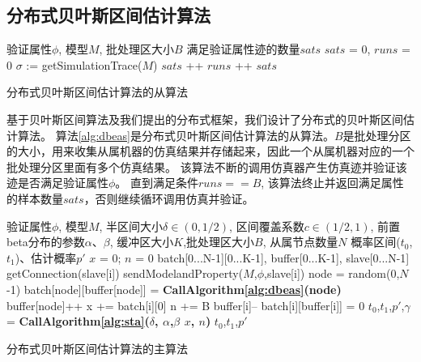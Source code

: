 \subsection{分布式贝叶斯区间估计算法}
\begin{algorithm}[t]
\begin{algorithmic}[1]
\REQUIRE 验证属性$\phi$, 模型$M$, 批处理区大小$B$
\ENSURE 满足验证属性迹的数量$sats$
\STATE $sats$ = 0, $runs$ = 0
\LOOP
        \STATE $\sigma$ := getSimulationTrace($M$)
        \IF{$\sigma \models \phi$}
        \STATE $sats$ ++
        \ENDIF
        \STATE $runs$ ++ 
        \RETURN $sats$
        \ENDIF
\ENDLOOP
\end{algorithmic}
\caption{分布式贝叶斯区间估计算法的从算法}
\label{alg:dbeas}
\end{algorithm}
基于贝叶斯区间算法及我们提出的分布式框架，我们设计了分布式的贝叶斯区间估计算法。 算法\ref{alg:dbeas}是分布式贝叶斯区间估计算法的从算法。$B$是批处理分区的大小，用来收集从属机器的仿真结果并存储起来，因此一个从属机器对应的一个批处理分区里面有多个仿真结果。 该算法不断的调用仿真器产生仿真迹并验证该迹是否满足验证属性$\phi$。 直到满足条件$runs == B$, 该算法终止并返回满足属性的样本数量$sats$，否则继续循环调用仿真并验证。
\begin{algorithm}[t]
\begin{algorithmic}[1]
\REQUIRE 验证属性$\phi$, 模型$M$, 半区间大小$\delta \in (0, 1/2)$, 区间覆盖系数$c \in (1/2, 1)$, 前置beta分布的参数$\alpha$、$\beta$, 缓冲区大小$K$,批处理区大小$B$, 从属节点数量$N$
\ENSURE 概率区间($t_0$, $t_1$)、估计概率$p'$
\STATE $x$ = 0; $n$ = 0
\STATE batch[0...N-1][0...K-1], buffer[0...K-1], slave[0...N-1]
\LOOP 
\STATE getConnection(slave[i])
\STATE sendModelandProperty($M$,$\phi$,slave[i])
\RETURN
\ENDIF
\ENDLOOP
\LOOP
        \STATE node = random(0,$N$-1)
         \STATE batch[node][buffer[node]] = \textbf{CallAlgorithm\ref{alg:dbeas}(node)}
         \STATE buffer[node]++
         \ENDIF
         \LOOP
             \STATE x += batch[i][0]
              \STATE n += B
             \STATE buffer[i]--
             \STATE batch[i][buffer[i]] = 0
         \RETURN
         \ENDIF
         \ENDLOOP
         \ENDIF
         \STATE $t_0$,$t_1$,$p'$,$\gamma$ = \textbf{CallAlgorithm\ref{alg:sta}($\delta$, $\alpha$,$\beta$ $x$, $n$)}
         \RETURN $t_0$,$t_1$,$p'$
         \ENDIF
\ENDLOOP
\end{algorithmic}
\caption{分布式贝叶斯区间估计算法的主算法}
\label{alg:dbeam}
\end{algorithm}

